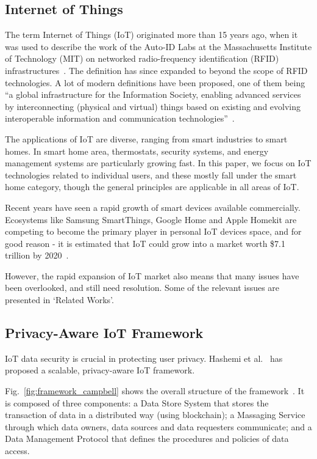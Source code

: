 \subsection{Internet of Things}
The term Internet of Things (IoT) originated more than 15 years ago, when it was used to describe the work of the Auto-ID Labs at the
Massachusetts Institute of Technology (MIT) on networked radio-frequency identification (RFID) infrastructures~\cite{atzori}. The definition has since expanded to beyond the scope of RFID technologies. A lot of modern definitions have been proposed, one of them being ``a global infrastructure for the Information Society, enabling advanced services by interconnecting (physical and virtual) things based on existing and evolving interoperable information and communication technologies''~\cite{itu}.

The applications of IoT are diverse, ranging from smart industries to smart homes. In smart home area, thermostats, security systems, and energy management systems are particularly growing fast. In this paper, we focus on IoT technologies related to individual users, and these mostly fall under the smart home category, though the general principles are applicable in all areas of IoT.

Recent years have seen a rapid growth of smart devices available commercially. Ecosystems like Samsung SmartThings, Google Home and Apple Homekit are competing to become the primary player in personal IoT devices space, and for good reason -  it is estimated that IoT could grow into a market worth \$7.1 trillion by 2020~\cite{idc}.

However, the rapid expansion of IoT market also means that many issues have been overlooked, and still need resolution. Some of the relevant issues are presented in `Related Works'.

\subsection{Privacy-Aware IoT Framework}
IoT data security is crucial in protecting user privacy. Hashemi et al.~\cite{campbell} has proposed a scalable, privacy-aware IoT framework.

Fig.~\ref{fig:framework_campbell} shows the overall structure of the framework~\cite{campbell}. It is composed of three components: a Data Store System that stores the transaction of data in a distributed way (using blockchain); a Massaging Service through which data owners, data sources and data requesters communicate; and a Data Management Protocol that defines the procedures and policies of data access.

